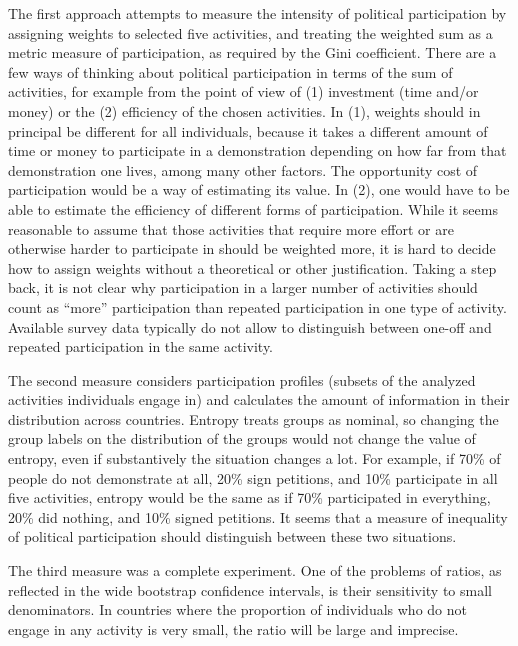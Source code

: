 \documentclass[12pt,]{article}
\begin{document}
The first approach attempts to measure the intensity of political participation by assigning weights to selected five activities, and treating the weighted sum as a metric measure of participation, as required by the Gini coefficient. There are a few ways of thinking about political participation in terms of the sum of activities, for example from the point of view of (1) investment (time and/or money) or the (2) efficiency of the chosen activities. In (1), weights should in principal be different for all individuals, because it takes a different amount of time or money to participate in a demonstration depending on how far from that demonstration one lives, among many other factors. The opportunity cost of participation would be a way of estimating its value. In (2), one would have to be able to estimate the efficiency of different forms of participation.
While it seems reasonable to assume that those activities that require more effort or are otherwise harder to participate in should be weighted more, it is hard to decide how to assign weights without a theoretical or other justification.
Taking a step back, it is not clear why participation in a larger number of activities should count as ``more'' participation than repeated participation in one type of activity. Available survey data typically do not allow to distinguish between one-off and repeated participation in the same activity.

The second measure considers participation profiles (subsets of the analyzed activities individuals engage in) and calculates the amount of information in their distribution across countries. Entropy treats groups as nominal, so changing the group labels on the distribution of the groups would not change the value of entropy, even if substantively the situation changes a lot. For example, if 70\% of people do not demonstrate at all, 20\% sign petitions, and 10\% participate in all five activities, entropy would be the same as if 70\% participated in everything, 20\% did nothing, and 10\% signed petitions. It seems that a measure of inequality of political participation should distinguish between these two situations.

The third measure was a complete experiment. One of the problems of ratios, as reflected in the wide bootstrap confidence intervals, is their sensitivity to small denominators. In countries where the proportion of individuals who do not engage in any activity is very small, the ratio will be large and imprecise.
\end{document}
